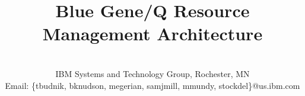 \documentclass[conference]{IEEEtran}
\begin{document}
\title{Blue Gene/Q Resource Management Architecture}

\author{\\
IBM Systems and Technology Group, Rochester, MN\\
Email: \{tbudnik, bknudson, megerian, samjmill, mmundy, stockdel\}@us.ibm.com}

\maketitle

\begin{abstract}

\end{abstract}









\end{document}
